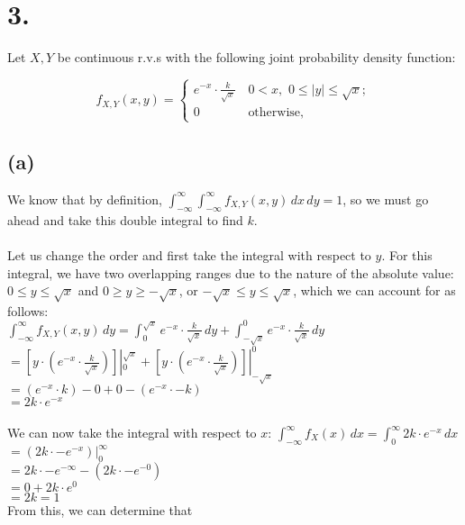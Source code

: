 \documentclass{article}
\begin{document}
\section*{3.}
{\Large 

Let  $X, Y$ be continuous r.v.s with the following joint probability density function:

\[
f_{X,Y}\left(x,y\right)=\begin{cases}
e^{-x}\cdot\frac{k}{\sqrt{x}}& \,0< x,\,\, 0\le|y| \le \sqrt{x};\\
0 & \,\mbox{otherwise,}
\end{cases}
\]

\subsection*{(a)}
We know that by definition, $\int_{-\infty}^{\infty} \int_{-\infty}^{\infty} f_{X, Y} (x, y) \,dx \,dy = 1$, so we must go ahead and take this double integral to find $k$. \\ \\
Let us change the order and first take the integral with respect to $y$. For this integral, we have two overlapping ranges due to the nature of the absolute value: $0 \leq y \leq \sqrt{x}$ and $0 \geq y \geq -\sqrt{x}$, or $-\sqrt{x} \leq y \leq \sqrt{x}$, which we can account for as follows: \\ 
$\int_{-\infty}^{\infty} f_{X, Y} (x, y) \,dy = \int_{0}^{\sqrt{x}} e^{-x} \cdot \frac{k}{\sqrt{x}} \,dy + \int_{-\sqrt{x}}^{0} e^{-x} \cdot \frac{k}{\sqrt{x}} \,dy$ \\
$= [y \cdot (e^{-x} \cdot \frac{k}{\sqrt{x}})] |_{0}^{\sqrt{x}} + [y \cdot (e^{-x} \cdot \frac{k}{\sqrt{x}})] |_{-\sqrt{x}}^{0}$ \\ 
$= (e^{-x} \cdot k) - 0 + 0 - (e^{-x} \cdot -k)$ \\ 
$= 2k \cdot e^{-x}$ \\ \\
We can now take the integral with respect to $x$:
$\int_{-\infty}^{\infty} f_{X} (x) \,dx = \int_{0}^{\infty} 2k \cdot e^{-x} \,dx$ \\ 
$ = (2k \cdot -e^{-x}) |_{0}^{\infty}$ \\ 
$ = 2k \cdot -e^{-\infty} - (2k \cdot -e^{-0})$ \\ 
$ = 0 + 2k \cdot e^{0}$ \\ 
$ = 2k = 1$ \\
From this, we can determine that 

}
\end{document}
